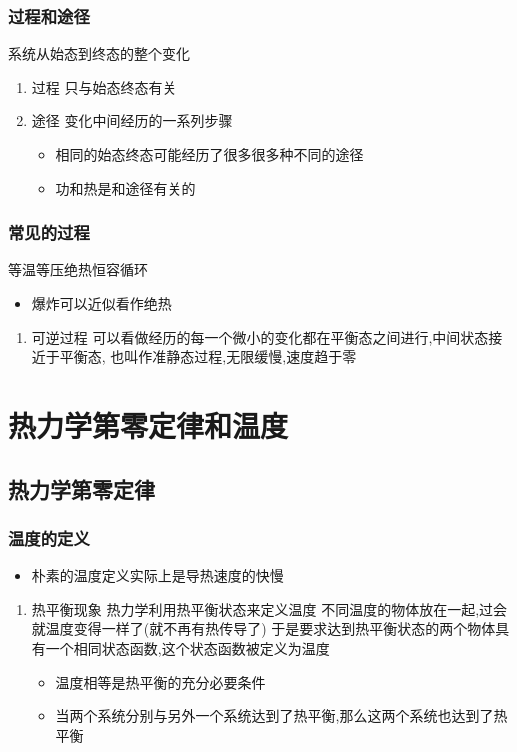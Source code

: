 \documentclass[11pt]{article}
\begin{document}
\subsubsection{过程和途径}
\label{sec:org1a9bd95}
系统从始态到终态的整个变化
\begin{enumerate}
\item 过程
\label{sec:org946251e}
只与始态终态有关
\item 途径
\label{sec:org3b87660}
变化中间经历的一系列步骤
\begin{itemize}
\item 相同的始态终态可能经历了很多很多种不同的途径
\item 功和热是和途径有关的
\end{itemize}
\end{enumerate}
\subsubsection{常见的过程}
\label{sec:org8861db6}
等温等压绝热恒容循环
\begin{itemize}
\item 爆炸可以近似看作绝热
\end{itemize}

\begin{enumerate}
\item 可逆过程
\label{sec:org22e5ec4}
可以看做经历的每一个微小的变化都在平衡态之间进行,中间状态接近于平衡态,
也叫作准静态过程,无限缓慢,速度趋于零
\end{enumerate}
\section{热力学第零定律和温度}
\label{sec:org9bd7f1c}
\subsection{热力学第零定律}
\label{sec:orgd7fa599}
\subsubsection{温度的定义}
\label{sec:org1fc751f}
\begin{itemize}
\item 朴素的温度定义实际上是导热速度的快慢
\end{itemize}
\begin{enumerate}
\item 热平衡现象
\label{sec:org82f874b}
热力学利用热平衡状态来定义温度
不同温度的物体放在一起,过会就温度变得一样了(就不再有热传导了)
于是要求达到热平衡状态的两个物体具有一个相同状态函数,这个状态函数被定义为温度
\begin{itemize}
\item 温度相等是热平衡的充分必要条件
\item 当两个系统分别与另外一个系统达到了热平衡,那么这两个系统也达到了热平衡
\end{itemize}
\end{enumerate}
\end{document}
